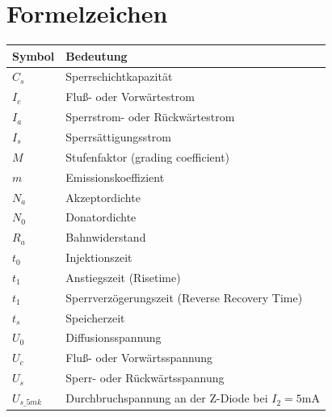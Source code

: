 \documentclass[
	a4paper, %
	12pt, %
]{CSUniSchoolLabReport}
\begin{document}
\section{Formelzeichen}
\begin{table}[h]
\centering
\begin{tabular}{ll}
\toprule
\textbf{Symbol} & \textbf{Bedeutung} \\
\midrule
$C_s$    & Sperrschichtkapazität \\
$I_c$    & Fluß- oder Vorwärtestrom \\
$I_a$    & Sperrstrom- oder Rückwärtestrom \\
$I_s$    & Sperrsättigungsstrom \\
$M$      & Stufenfaktor (grading coefficient) \\
$m$      & Emissionskoeffizient \\
$N_a$    & Akzeptordichte \\
$N_0$    & Donatordichte \\
$R_a$    & Bahnwiderstand \\
$t_0$    & Injektionszeit \\
$t_1$    & Anstiegszeit (Risetime) \\
$t_1$    & Sperrverzögerungszeit (Reverse Recovery Time) \\
$t_s$    & Speicherzeit \\
$U_0$    & Diffusionsspannung \\
$U_c$    & Fluß- oder Vorwärtsspannung \\
$U_s$    & Sperr- oder Rückwärtsspannung \\
$U_{s\_5mk}$ & Durchbruchspannung an der Z-Diode bei $I_2 = 5$mA \\
\bottomrule
\end{tabular}
\end{table}

\printbibliography %

\end{document}
